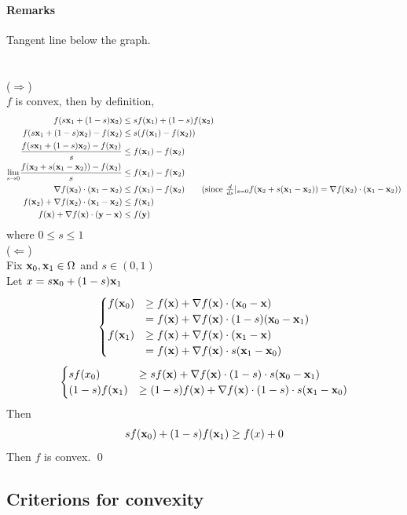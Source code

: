 \documentclass[11pt]{article}
\begin{document}
\paragraph{Remarks}
Tangent line below the graph.\\\\
 \\
($\Rightarrow$) \\
$f$ is convex, then by definition,
\begin{align*}
f(s\vx_1 + (1-s)\vx_2) &\leq sf(\vx_1) + (1-s)f(\vx_2)\\
f(s\vx_1 + (1-s)\vx_2) - f(\vx_2) &\leq s(f(\vx_1) - f(\vx_2)) \\
\frac{f(s\vx_1 + (1-s)\vx_2) - f(\vx_2)}{s} &\leq f(\vx_1) - f(\vx_2) \\
\underset{s \rightarrow 0}{\lim} \frac{f(\vx_2 + s(\vx_1 - \vx_2)) - f(\vx_2)}{s} &\leq f(\vx_1) - f(\vx_2) \\
\nabla f(\vx_2)\cdot(\vx_1 - \vx_2) &\leq f(\vx_1) - f(\vx_2) \tag{since $\frac{d}{ds}|_{s=0} f(\vx_2 + s(\vx_1 - \vx_2)) = \nabla f(\vx_2) \cdot (\vx_1 - \vx_2)$}\\
f(\vx_2) + \nabla f(\vx_2)\cdot(\vx_1 - \vx_2) &\leq f(\vx_1)\\
f(\vx) + \nabla f(\vx) \cdot (\vy-\vx) &\leq f(\vy)
\end{align*}
where $0\leq s \leq 1$ \\
($\Leftarrow$)\\
Fix $\textbf{x}_0, \textbf{x}_1 \in \Omega$ and $s \in (0,1)$ \\
Let $x = s\textbf{x}_0 + (1-s)\textbf{x}_1$ \\
$$\begin{cases}
	f(\textbf{x}_0) &\geq f(\textbf{x}) + \nabla f(\textbf{x}) \cdot (\textbf{x}_0 - \textbf{x}) \\
	&= f(\textbf{x}) + \nabla f(\textbf{x}) \cdot (1-s)(\textbf{x}_0 - \textbf{x}_1) \\
	f(\textbf{x}_1) &\geq f(\textbf{x}) + \nabla f(\textbf{x}) \cdot (\textbf{x}_1 - \textbf{x}) \\
	&= f(\textbf{x}) + \nabla f(\textbf{x}) \cdot s(\textbf{x}_1 - \textbf{x}_0) \\
\end{cases}$$
	$$\begin{cases}sf(x_0) &\geq sf(\textbf{x}) + \nabla f(\textbf{x}) \cdot (1-s) \cdot s(\textbf{x}_0 - \textbf{x}_1) \\
	(1-s)f(\textbf{x}_1) &\geq (1-s)f(\textbf{x}) + \nabla f(\textbf{x}) \cdot (1-s)\cdot s(\textbf{x}_1 - \textbf{x}_0)  \end{cases}$$
Then
$$sf(\textbf{x}_0) + (1-s)f(\textbf{x}_1) \geq f(x) + 0$$
Then $f$ is convex.
\qed

\subsection{Criterions for convexity}
\end{document}
